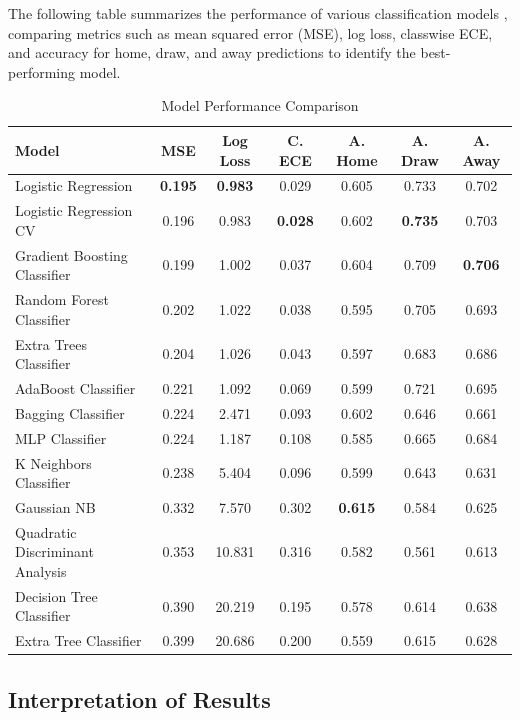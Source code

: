 The following table summarizes the performance of various classification models \cite{Bishop2006}, comparing metrics such as mean squared error (MSE), log loss, classwise ECE, and accuracy for home, draw, and away predictions to identify the best-performing model.

\begin{table}[H]
    \centering
    \caption{Model Performance Comparison}
    \label{tab:model_performance}
    \begin{tabular}{|l|c|c|c|c|c|c|}
        \hline
        \textbf{Model} & \textbf{MSE} & \textbf{Log Loss} & \textbf{C. ECE} & \textbf{A. Home} & \textbf{A. Draw} & \textbf{A. Away} \\
        \hline
        Logistic Regression & \textbf{0.195} & \textbf{0.983} & 0.029 & 0.605 & 0.733 & 0.702 \\
        Logistic Regression CV & 0.196 & 0.983 & \textbf{0.028} & 0.602 & \textbf{0.735} & 0.703 \\
        Gradient Boosting Classifier & 0.199 & 1.002 & 0.037 & 0.604 & 0.709 & \textbf{0.706} \\
        Random Forest Classifier & 0.202 & 1.022 & 0.038 & 0.595 & 0.705 & 0.693 \\
        Extra Trees Classifier & 0.204 & 1.026 & 0.043 & 0.597 & 0.683 & 0.686 \\
        AdaBoost Classifier & 0.221 & 1.092 & 0.069 & 0.599 & 0.721 & 0.695 \\
        Bagging Classifier & 0.224 & 2.471 & 0.093 & 0.602 & 0.646 & 0.661 \\
        MLP Classifier & 0.224 & 1.187 & 0.108 & 0.585 & 0.665 & 0.684 \\
        K Neighbors Classifier & 0.238 & 5.404 & 0.096 & 0.599 & 0.643 & 0.631 \\
        Gaussian NB & 0.332 & 7.570 & 0.302 & \textbf{0.615} & 0.584 & 0.625 \\
        Quadratic Discriminant Analysis & 0.353 & 10.831 & 0.316 & 0.582 & 0.561 & 0.613 \\
        Decision Tree Classifier & 0.390 & 20.219 & 0.195 & 0.578 & 0.614 & 0.638 \\
        Extra Tree Classifier & 0.399 & 20.686 & 0.200 & 0.559 & 0.615 & 0.628 \\
        \hline
    \end{tabular}
\end{table}


\subsection{Interpretation of Results}
\label{subsec:interpretation}

